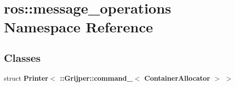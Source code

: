 \section{ros\-:\-:message\-\_\-operations Namespace Reference}
\label{namespaceros_1_1message__operations}
\subsection*{Classes}
\begin{DoxyCompactItemize}
\item 
struct {\bf Printer$<$ \-::\-Grijper\-::command\-\_\-$<$ Container\-Allocator $>$ $>$}
\end{DoxyCompactItemize}
